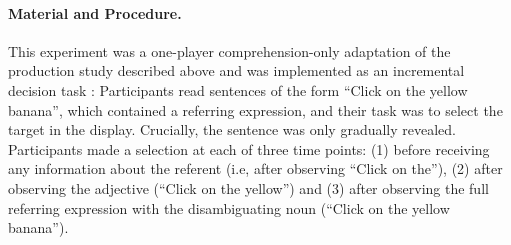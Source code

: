 \documentclass[10pt,letterpaper]{article}
\begin{document}



\paragraph{Material and Procedure.} This experiment was a one-player comprehension-only adaptation of the production study described above and was implemented as an incremental decision task \cite{Qing:2018}: Participants read sentences of the form ``Click on the yellow banana'', which contained a referring expression, and their task was to select the target in the display. Crucially, the sentence was only gradually revealed. Participants made a selection at each of three time points: (1) before receiving any information about the referent (i.e, after observing ``Click on the''), (2) after observing the adjective (``Click on the yellow'') and (3) after observing the full referring expression with the disambiguating noun (``Click on the yellow banana''). 
\end{document}
